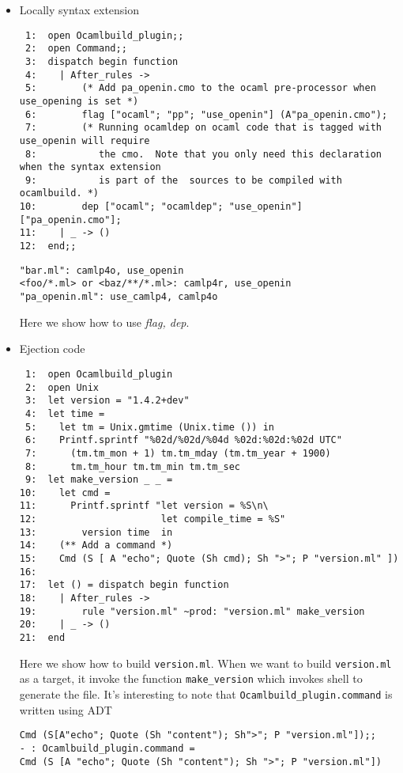 \documentclass[11pt]{article}
\begin{document}
\begin{itemize}
\begin{itemize}
\item Locally syntax extension\\
\label{sec-1-12-2-2-2}%
\begin{verbatim}
 1:  open Ocamlbuild_plugin;;
 2:  open Command;;
 3:  dispatch begin function
 4:    | After_rules ->
 5:        (* Add pa_openin.cmo to the ocaml pre-processor when use_opening is set *)
 6:        flag ["ocaml"; "pp"; "use_openin"] (A"pa_openin.cmo");
 7:        (* Running ocamldep on ocaml code that is tagged with use_openin will require
 8:           the cmo.  Note that you only need this declaration when the syntax extension
 9:           is part of the  sources to be compiled with ocamlbuild. *)
10:        dep ["ocaml"; "ocamldep"; "use_openin"] ["pa_openin.cmo"];
11:    | _ -> ()
12:  end;;
\end{verbatim}


\begin{verbatim}
"bar.ml": camlp4o, use_openin
<foo/*.ml> or <baz/**/*.ml>: camlp4r, use_openin
"pa_openin.ml": use_camlp4, camlp4o
\end{verbatim}
      Here we show how to use \emph{flag, dep}.


\item Ejection code\\
\label{sec-1-12-2-2-3}%
\begin{verbatim}
 1:  open Ocamlbuild_plugin
 2:  open Unix
 3:  let version = "1.4.2+dev"
 4:  let time =
 5:    let tm = Unix.gmtime (Unix.time ()) in
 6:    Printf.sprintf "%02d/%02d/%04d %02d:%02d:%02d UTC"
 7:      (tm.tm_mon + 1) tm.tm_mday (tm.tm_year + 1900)
 8:      tm.tm_hour tm.tm_min tm.tm_sec
 9:  let make_version _ _ =
10:    let cmd =
11:      Printf.sprintf "let version = %S\n\
12:                      let compile_time = %S"
13:        version time  in
14:    (** Add a command *)
15:    Cmd (S [ A "echo"; Quote (Sh cmd); Sh ">"; P "version.ml" ])
16:  
17:  let () = dispatch begin function
18:    | After_rules ->
19:        rule "version.ml" ~prod: "version.ml" make_version
20:    | _ -> ()
21:  end
\end{verbatim}

      Here we show how to build \texttt{version.ml}. When we want to build
      \texttt{version.ml} as a target, it invoke the function \texttt{make\_version}
      which invokes shell to generate the file.
      It's interesting to note that \texttt{Ocamlbuild\_plugin.command} is
      written using ADT


\begin{verbatim}
Cmd (S[A"echo"; Quote (Sh "content"); Sh">"; P "version.ml"]);;
- : Ocamlbuild_plugin.command =
Cmd (S [A "echo"; Quote (Sh "content"); Sh ">"; P "version.ml"])
\end{verbatim}



\end{itemize}
\end{itemize}
\end{document}
